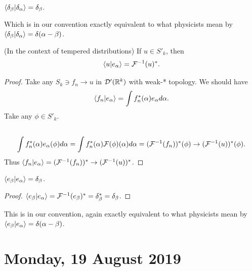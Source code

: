 \documentclass[main.tex]{subfiles}
\begin{document}
\begin{corollary}
$\braket{\delta_\beta}{\delta_\alpha} = \delta_\beta$.
\end{corollary}
Which is in our convention exactly equivalent to what physicists mean by $\braket{\delta_\beta}{\delta_\alpha} = \delta(\alpha - \beta)$.
\begin{theorem} (In the context of tempered distributions)
If $u\in S'_k$, then
\begin{equation}
\braket{u}{e_\alpha} = \mathcal{F}^{-1}(u)^*.
\end{equation}
\end{theorem}
\begin{proof}
Take any $S_k\ni f_n \to u$ in $\mathcal{D}'(\mathbb{R}^k)$ with weak-* topology.
We should have
\begin{equation}
\braket{f_n}{e_\alpha} = \int f^*_n(\alpha) e_\alpha d\alpha.
\end{equation}
Take any $\phi\in S'_k$.
\begin{multline}
\\
\int f^*_n(\alpha) e_\alpha(\phi) d\alpha = \int f^*_n(\alpha)\mathcal{F}(\phi)(\alpha) d\alpha = (\mathcal{F}^{-1}(f_n))^*(\phi) \to (\mathcal{F}^{-1}(u))^*(\phi).
\end{multline}
Thus $\braket{f_n}{e_\alpha} =  (\mathcal{F}^{-1}(f_n))^* \to (\mathcal{F}^{-1}(u))^*$.
\end{proof}
\begin{corollary}
$\braket{e_\beta}{e_\alpha} = \delta_\beta$.
\end{corollary}
\begin{proof}
$\braket{e_\beta}{e_\alpha} = \mathcal{F}^{-1}(e_\beta)^* = \delta_\beta^* = \delta_\beta$.
\end{proof}
This is in our convention, again exactly equivalent to what physicists mean by $\braket{e_\beta}{e_\alpha} = \delta(\alpha - \beta)$.
\section{Monday, 19 August 2019}
\end{document}
